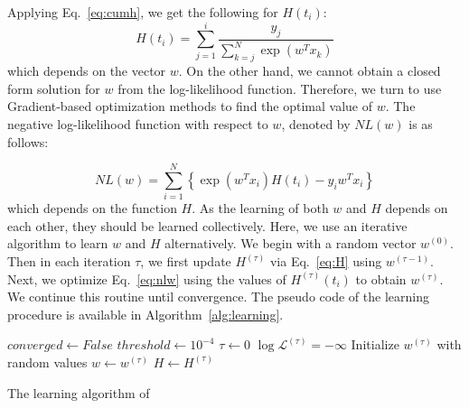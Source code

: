 Applying Eq.~\ref{eq:cumh}, we get the following for $H(t_i)$:
\begin{equation}\label{eq:H}
H(t_i)=\sum_{j=1}^{i}\frac{y_j}{\sum_{k=j}^{N}\exp(w^Tx_k)}
\end{equation}
which depends on the vector $w$. On the other hand, we cannot obtain a closed form solution for $w$ from the log-likelihood function. Therefore, we turn to use Gradient-based optimization methods to find the optimal value of $w$. The negative log-likelihood function with respect to $w$, denoted by $NL(w)$ is as follows:

\begin{equation}\label{eq:nlw}
NL(w)=\sum_{i=1}^{N}\left\lbrace\exp(w^Tx_i)H(t_i)-y_iw^Tx_i\right\rbrace
\end{equation}
which depends on the function $H$. As the learning of both $w$ and $H$ depends on each other, they should be learned collectively. Here, we use an iterative algorithm to learn $w$ and $H$ alternatively. We begin with a random vector $w^{(0)}$. Then in each iteration $\tau$, we first update $H^{(\tau)}$ via Eq.~\ref{eq:H} using $w^{(\tau-1)}$. Next, we optimize Eq.~\ref{eq:nlw} using the values of $H^{(\tau)}(t_i)$ to obtain $w^{(\tau)}$. We continue this routine until convergence. The pseudo code of the learning procedure is available in Algorithm~\ref{alg:learning}.

\begin{algorithm}[t]
	\small
	\SetAlgoLined
	$converged\leftarrow False$\;
	$threshold\leftarrow10^{-4}$\;
	$\tau\leftarrow 0$\;
	$\log\mathcal{L}^{(\tau)}=-\infty$\;
	Initialize $w^{(\tau)}$ with random values\;
	$w\leftarrow w^{(\tau)}$\;
	$H\leftarrow H^{(\tau)}$\;
	\caption{The learning algorithm of \npglm}
	\label{alg:learning}
\end{algorithm}



